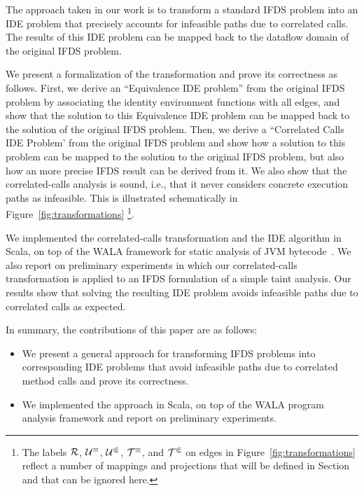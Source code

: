

The approach taken in our work is to transform a standard IFDS problem into an
IDE problem that precisely accounts for infeasible paths due to correlated calls. 
The results of this IDE problem can be mapped back to the dataflow domain of the 
original IFDS problem.

We present a formalization of the transformation and prove its correctness
as follows. First, we derive an ``Equivalence IDE problem'' from the original 
IFDS problem by associating the identity environment functions with all edges,
and show that the solution to this Equivalence IDE problem can be mapped back
to the solution of the original IFDS problem. Then, we derive a ``Correlated Calls 
IDE Problem' from the original IFDS problem and show how a solution to this problem 
can be mapped to the solution to the original IFDS problem, but also how an
more precise IFDS result can be derived from it. 
We also show that the correlated-calls analysis is sound, i.e., that it never considers concrete execution paths as infeasible.
This is illustrated schematically
in Figure~\ref{fig:transformations}%
\footnote{ 
  The labels $\mathcal R$, $\mathcal U^\equiv$, $\mathcal U^\Subset$, $\mathcal T^\equiv$, and $\mathcal T^\Subset$ on edges in 
  Figure~\ref{fig:transformations} reflect a number of mappings and projections 
  that will be defined in Section~ and that can be ignored here.
}.  

We implemented the correlated-calls transformation and the IDE algorithm in Scala,
on top of the WALA framework for static analysis of JVM bytecode~\cite{fink2012wala}.
We also report on preliminary experiments in which our correlated-calls transformation
is applied to an IFDS formulation of a simple taint analysis. Our results show that
solving the resulting IDE problem avoids infeasible paths due to correlated calls as
expected.  

In summary, the contributions of this paper are as follows:
\begin{itemize}
  \item
    We present a general approach for transforming IFDS problems into corresponding
    IDE problems that avoid infeasible paths due to correlated method calls and
    prove its correctness. 
  \item
    We implemented the approach in Scala, on top of the WALA program analysis framework
    and report on preliminary experiments. 
\end{itemize}

